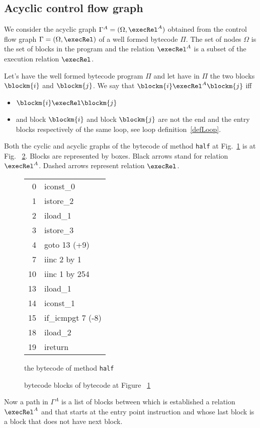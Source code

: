 \subsection{Acyclic control flow graph} \label{graph}
We consider the acyclic graph $\Gamma^A = ( \Omega, \execRel^A)$ obtained from the control flow graph 
$\Gamma  = ( \Omega, \execRel)$ of a well formed bytecode $ \Pi $. The set of nodes $\Omega$ is the set of  blocks in the 
program and the relation  $\execRel^A$ is a subset of the  execution relation $\execRel$.
\begin{defn}
\label{acyclicExRel}
Let's have the well formed bytecode program $\Pi$ and let have in $\Pi$ the two blocks  $\blockm{i} $ and   $\blockm{j}$. We say 
that $\blockm{i} \execRel^A \blockm{j}$ iff
\begin{itemize}
\item $\blockm{i} \execRel \blockm{j}$
\item and block $\blockm{i}$ and block $\blockm{j}$ are not the end and the entry blocks respectively of the same loop, see loop definition~\ref{defLoop}.
\end{itemize}
\end{defn}

Both the cyclic and acyclic graphs of the bytecode of method \texttt{half} at Fig.~\ref{halfBC} is at Fig. ~\ref{blockBC}. Blocks are represented by boxes. Black arrows stand for relation $\execRel^A$. Dashed arrows represent relation $\execRel$.

\begin{figure}[p]
\begin{center}
\begin{tabular}{rl}
 0 & iconst\_0\\ 
 1 & istore\_2\\
 2 & iload\_1\\
 3 & istore\_3\\%
 4 & goto 13 (+9)\\%
 7 & iinc 2 by 1\\%
10 & iinc 1 by 254\\%
13 & iload\_1\\%
14 & iconst\_1\\%
15 & if\_icmpgt 7 (-8)\\%
18 & iload\_2\\%
19 & ireturn\\%
\end{tabular}
\end{center}
\caption{the bytecode of method \texttt{half}}
\label{halfBC}
\end{figure}

\begin{figure}[p]
\begin{center}
\end{center}
\caption{bytecode blocks of bytecode at Figure ~\ref{halfBC}}
\label{blockBC}
\end{figure}

Now a path in $\Gamma^A$  is a list of blocks between which is established a relation $\execRel^A$ and that starts at the entry point instruction and whose last block is a block that does not have next block.

